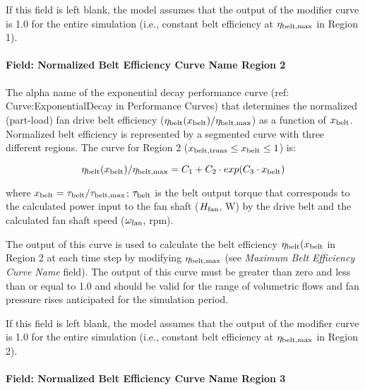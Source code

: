 If this field is left blank, the model assumes that the output of the modifier curve is 1.0 for the entire simulation (i.e., constant belt efficiency at \(\eta_{\rm{belt, max}}\) in Region 1).

\paragraph{Field: Normalized Belt Efficiency Curve Name Region 2}\label{field-normalized-belt-efficiency-curve-name-region-2}

The alpha name of the exponential decay performance curve (ref: Curve:ExponentialDecay in Performance Curves) that determines the normalized (part-load) fan drive belt efficiency (\(\eta_{\rm{belt}} (x_{\rm{belt}}) / \eta_{\rm{belt, max}}\)) as a function of \(x_{\rm{belt}}\). Normalized belt efficiency is represented by a segmented curve with three different regions. The curve for Region 2 (\(x_{\rm{belt, trans}} \le x_{\rm{belt}} \le 1\)) is:

\begin{equation}
  \eta_{\rm{belt}} (x_{\rm{belt}}) / \eta_{\rm{belt, max}} = C_1 + C_2 \cdot exp(C_3 \cdot x_{\rm{belt}})
\end{equation}

where \(x_{\rm{belt}} = \tau_{\rm{belt}} / \tau_{\rm{belt, max}}\); \(\tau_{\rm{belt}}\) is the belt output torque that corresponds to the calculated power input to the fan shaft (\(H_{\rm{fan}}\), W) by the drive belt and the calculated fan shaft speed (\(\omega_{\rm{fan}}\), rpm).

The output of this curve is used to calculate the belt efficiency \(\eta_{\rm{belt}} (x_{\rm{belt}}\) in Region 2 at each time step by modifying \(\eta_{\rm{belt, max}}\) (see \emph{Maximum Belt Efficiency Curve Name} field). The output of this curve must be greater than zero and less than or equal to 1.0 and should be valid for the range of volumetric flows and fan pressure rises anticipated for the simulation period.

If this field is left blank, the model assumes that the output of the modifier curve is 1.0 for the entire simulation (i.e., constant belt efficiency at \(\eta_{\rm{belt, max}}\) in Region 2).

\paragraph{Field: Normalized Belt Efficiency Curve Name Region 3}\label{field-normalized-belt-efficiency-curve-name-region-3}


